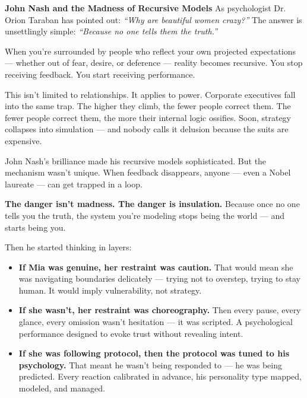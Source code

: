 \begin{HistoricalSidebar}{\textbf{John Nash and the Madness of Recursive Models}}
  As psychologist Dr. Orion Taraban has pointed out: \textit{``Why are beautiful women crazy?''} 
    The answer is unsettlingly simple: \textit{``Because no one tells them the truth.''}
  
  \medskip
  
  When you're surrounded by people who reflect your own projected expectations — whether out of fear, desire,
  or deference — reality becomes recursive. You stop receiving feedback. You start receiving performance.
  
  \medskip
  
  This isn’t limited to relationships. It applies to power.
  Corporate executives fall into the same trap. The higher they climb, the fewer people correct them.
  The fewer people correct them, the more their internal logic ossifies. Soon, strategy collapses
  into simulation — and nobody calls it delusion because the suits are expensive.
  
  \medskip
  
  John Nash’s brilliance made his recursive models sophisticated. But the mechanism wasn’t unique.
  When feedback disappears, anyone — even a Nobel laureate — can get trapped in a loop.
  
  \medskip
  
  \textbf{The danger isn't madness. The danger is insulation.}
  Because once no one tells you the truth, the system you’re modeling stops being the world —
  and starts being you.
  
\end{HistoricalSidebar}

\medskip






Then he started thinking in layers:

\begin{itemize}
    \item \textbf{If Mia was genuine, her restraint was caution.} 
    That would mean she was navigating boundaries delicately — trying not to overstep, trying to stay human. It would imply vulnerability, not strategy.

    \item \textbf{If she wasn’t, her restraint was choreography.} 
    Then every pause, every glance, every omission wasn’t hesitation — it was scripted. A psychological performance designed to evoke trust without revealing intent.

    \item \textbf{If she was following protocol, then the protocol was tuned to his psychology.} 
    That meant he wasn’t being responded to — he was being predicted. Every reaction calibrated in advance, his personality type mapped, modeled, and managed.
\end{itemize}



